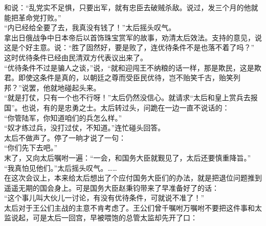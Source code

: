 和说：“乱党实不足惧，只要出军，就有忠臣去破贼杀敌。说过，发三个月的他就能把革命党打败。”\\

“内已经给全要了去，我真没有钱了！”太后摇头叹气。\\

拿出日俄战争中日本帝后以首饰珠宝赏军的故事，劝清太后效法。支持的意见，说这是个好主意。说：“胜了固然好，要是败了，连优待条件不是也落不着了吗？”\\

这时优待条件已经由民清双方代表议出来了。\\

“优待条件不过是骗人之谈，”说，“就和迎闯王不纳粮的话一样，那是欺民，这是欺君。即使这条件是真的，以朝廷之尊而受臣民优待，岂不贻笑千古，贻笑列邦？”说罢，他就地碰起头来。\\

“就是打仗，只有一个也不行呀！”太后仍然没信心。就请求“太后和皇上赏兵去报国”。也说，有的是忠勇之士。太后转过头，问跪在一边一直不说话的：\\

“你管陆军，你知道咱们的兵怎么样。”\\

“奴才练过兵，没打过仗，不知道。”连忙碰头回答。\\

太后不做声了。停了一晌才说了一句：\\

“你们先下去吧。”\\

末了，又向太后嘱咐一遍：“一会，和国务大臣就觐见了，太后还要慎重降旨。”\\

“我真怕见他们。”太后摇头叹气。……\\

在这次会议上，本来给太后想出了个应付国务大臣们的办法，就是把退位问题推到遥遥无期的国会身上。可是国务大臣赵秉钧带来了早准备好了的话：\\

“这个事儿叫大伙儿一讨论，有没有优待条件，可就说不准了！”\\

太后对于王公们主战的主意不肯考虑了。王公们曾千嘱咐万嘱咐不要把这件事和太监说起，可是太后一回宫，早被喂饱的总管太监却先开了口：\\

